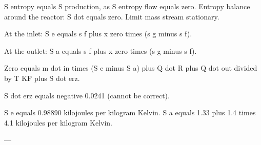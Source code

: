 S entropy equals S production, as S entropy flow equals zero.  
Entropy balance around the reactor:  
S dot equals zero. Limit mass stream stationary.  

At the inlet:  
S e equals s f plus x zero times (s g minus s f).  

At the outlet:  
S a equals s f plus x zero times (s g minus s f).  

Zero equals m dot in times (S e minus S a) plus Q dot R plus Q dot out divided by T KF plus S dot erz.  

S dot erz equals negative 0.0241 (cannot be correct).  

S e equals 0.98890 kilojoules per kilogram Kelvin.  
S a equals 1.33 plus 1.4 times 4.1 kilojoules per kilogram Kelvin.  

---